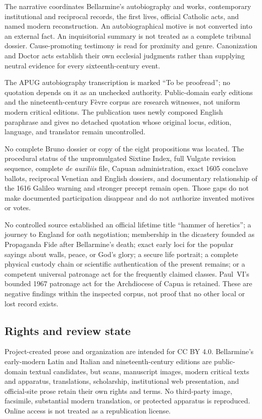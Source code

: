 The narrative coordinates Bellarmine's autobiography and works, contemporary
institutional and reciprocal records, the first lives, official Catholic acts,
and named modern reconstruction.  An autobiographical motive is not converted
into an external fact.  An inquisitorial summary is not treated as a complete
tribunal dossier.  Cause-promoting testimony is read for proximity and genre.
Canonization and Doctor acts establish their own ecclesial judgments rather
than supplying neutral evidence for every sixteenth-century event.

The APUG autobiography transcription is marked ``To be proofread''; no
quotation depends on it as an unchecked authority.  Public-domain early
editions and the nineteenth-century Fèvre corpus are research witnesses, not
uniform modern critical editions.  The publication uses newly composed English
paraphrase and gives no detached quotation whose original locus, edition,
language, and translator remain uncontrolled.

No complete Bruno dossier or copy of the eight propositions was located.  The
procedural status of the unpromulgated Sixtine Index, full Vulgate revision
sequence, complete \emph{de auxiliis} file, Capuan administration, exact 1605
conclave ballots, reciprocal Venetian and English dossiers, and documentary
relationship of the 1616 Galileo warning and stronger precept remain open.
Those gaps do not make documented participation disappear and do not authorize
invented motives or votes.

No controlled source established an official lifetime title ``hammer of
heretics''; a journey to England for oath negotiation; membership in the
dicastery founded as Propaganda Fide after Bellarmine's death; exact early loci
for the popular sayings about walls, peace, or God's glory; a secure life
portrait; a complete physical custody chain or scientific authentication of
the present remains; or a competent universal patronage act for the frequently
claimed classes.  Paul~VI's bounded 1967 patronage act for the Archdiocese of
Capua is retained.  These are negative findings within the inspected corpus,
not proof that no other local or lost record exists.

\subsection{Rights and review state}

Project-created prose and organization are intended for CC BY 4.0.
Bellarmine's early-modern Latin and Italian and nineteenth-century editions are
public-domain textual candidates, but scans, manuscript images, modern
critical texts and apparatus, translations, scholarship, institutional web
presentation, and official-site prose retain their own rights and terms.  No
third-party image, facsimile, substantial modern translation, or protected
apparatus is reproduced.  Online access is not treated as a republication
license.

